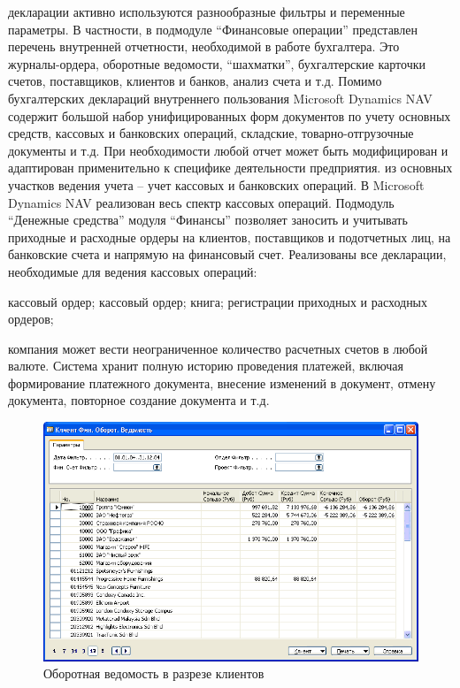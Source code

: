 \documentclass[14pt,a4paper]{reportmod}
\begin{document}
 декларации активно используются разнообразные фильтры и переменные параметры. В частности, в подмодуле ``Финансовые операции'' представлен перечень внутренней отчетности, необходимой в работе бухгалтера. Это журналы-ордера, оборотные ведомости, ``шахматки'', бухгалтерские карточки счетов, поставщиков, клиентов и банков, анализ счета и т.д. Помимо бухгалтерских деклараций внутреннего пользования Microsoft Dynamics NAV содержит большой набор унифицированных форм документов по учету основных средств, кассовых и банковских операций, складские, товарно-отгрузочные документы и т.д. При необходимости любой отчет может быть модифицирован и адаптирован применительно к специфике деятельности предприятия.
 из основных участков ведения учета – учет кассовых и банковских операций. В Microsoft Dynamics NAV реализован весь спектр кассовых операций. Подмодуль ``Денежные средства'' модуля ``Финансы'' позволяет заносить и учитывать приходные и расходные ордеры на клиентов, поставщиков и подотчетных лиц, на банковские счета и напрямую на финансовый счет. Реализованы все декларации, необходимые для ведения кассовых операций:
\begin{itemize}
   кассовый ордер;
   кассовый ордер;
   книга;
   регистрации приходных и расходных ордеров;
\end{itemize}
 компания может вести неограниченное количество расчетных счетов в любой валюте. Система хранит полную историю проведения платежей, включая формирование платежного документа, внесение изменений в документ, отмену документа, повторное создание документа и т.д.
\begin{figure}
  \centering
  \includegraphics[scale=0.50]{pics/navision_img1}
  \caption{Оборотная ведомость в разрезе клиентов}
  \label{pic:navision_pic1}
\end{figure}
\end{document}
